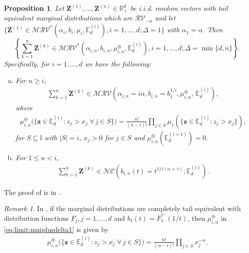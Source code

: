 \documentclass[aos]{imsart}
\numberwithin{equation}{section}
\theoremstyle{plain} %
\newtheorem{proposition}[theorem]{Proposition}
\theoremstyle{remark}
\newtheorem{remark}[theorem]{Remark}
\newcommand{\E}{\mathbb{E}}
\newcommand{\R}{\mathbb{R}}
\def\MRV{\mathcal{MRV}}
\def\RV{\mathcal{RV}}
\def\bZ{\boldsymbol Z}
\def\bz{\boldsymbol z}
\begin{document}
\begin{proposition}\label{prop:Delta1}
Let $\bZ^{(1)},\ldots, \bZ^{(n)} \in \R_+^d$ be  i.i.d.   random vectors
with  tail equivalent marginal distributions which are $\RV_{-\alpha}$  and let $\{\bZ^{(1)}\in \MRV^*(\alpha_i,b_i,\mu_i,\E_d^{(i)}), i=1,\ldots,d; \Delta=1\}$
 with $\alpha_1=\alpha$. Then $$
 \left\{\sum_{k=1}^n\bZ^{(k)}\in \MRV^*(\alpha_{i,n},b_{i,n},\mu_{i,n}^{\oplus},\E_d^{(i)}), i=1,\ldots,d;\Delta= \min\{d,n\}\right\}.$$ Specifically, for $i=1,\ldots,d$ we have the following:
\begin{enumerate}[(a)]
    \item For $n\geq i$,
    \begin{align}\label{eq:mrv:muiplusdelta1}
     \sum_{k=1}^n\bZ^{(k)}\in\MRV\left(\alpha_{i,n}=i\alpha,b_{i,n}=b_1^{1/i},\mu_{i,n}^{\oplus}, \, \E_d^{(i)}\right),
    \end{align}
    where
    \begin{align}\label{eq:limit:muiplusdelta1}
    \mu_{i,n}^{\oplus}\Big(\{\bz\in \E_d^{(i)}:z_j>x_j\; \forall\, j \in S\}\Big)= \frac{n!}{(n-i)!}\prod_{j\in S}
    \mu_1\left(\{\bz\in \E_d^{(i)}:z_j>x_j\}\right),
    \end{align}
    for $S\subseteq \mathbb{I}$ with $|S|=i$, $x_j>0$ for $j\in S$ {and $\mu_{i,n}^{\oplus}(\mathbb{E}_d^{(i+1)})=0$}.
    \item For $1\leq n<i$,
     \begin{align}\label{eq:mrv:nciplusdelta1}
     \sum_{k=1}^n\bZ^{(k)}\in\mathcal{NC}\left(b_{i,n}(t)=t^{1/i(\alpha+\gamma)}, \E_d^{(i)}\right).
    \end{align}
\end{enumerate}
\end{proposition}
The proof of  is in .
\begin{remark}\label{rem:delta1} In , if the marginal distributions are completely tail equivalent with distribution functions $F_j, j=1,\ldots, d$ and $b_1(t)=\overline{F}_1^{\leftarrow }(1/t)$, then $\mu_{i,n}^{\oplus}$ in \eqref{eq:limit:muiplusdelta1} is given by
 \begin{eqnarray*}
           \mu_{i,n}^{\oplus}\Big(\{\bz\in \E_d^{(i)}:z_j>x_j\; \forall\, j \in S\}\Big)=\frac{n!}{(n-i)!}\prod_{j\in S} x_j^{-\alpha}.
           \end{eqnarray*}
\end{remark}
\end{document}
